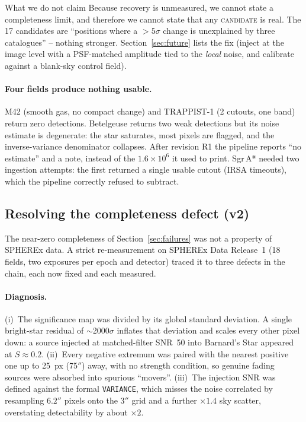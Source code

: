 \documentclass[11pt,a4paper]{article}
\begin{document}
\begin{cautionbox}{What we do not claim}
Because recovery is unmeasured, we cannot state a completeness limit, and therefore we cannot state that
any \textsc{candidate} is real. The 17 candidates are ``positions where a $>5\sigma$ change is
unexplained by three catalogues'' -- nothing stronger. Section~\ref{sec:future} lists the fix (inject at
the image level with a PSF-matched amplitude tied to the \emph{local} noise, and calibrate against a
blank-sky control field).
\end{cautionbox}

\paragraph{Four fields produce nothing usable.} M42 (smooth gas, no compact change) and TRAPPIST-1
(2 cutouts, one band) return zero detections. Betelgeuse returns two weak detections but its noise
estimate is degenerate: the star saturates, most pixels are flagged, and the inverse-variance
denominator collapses. After revision R1 the pipeline reports ``no estimate'' and a note, instead of
the $1.6\times10^{6}$ it used to print. Sgr\,A* needed two ingestion attempts: the first returned a
single usable cutout (IRSA timeouts), which the pipeline correctly refused to subtract.

\subsection{Resolving the completeness defect (v2)}
\label{sec:v2fix}

The near-zero completeness of Section~\ref{sec:failures} was not a property of SPHEREx data. A
strict re-measurement on SPHEREx Data Release~1 (18 fields, two exposures per epoch and detector)
traced it to three defects in the chain, each now fixed and each measured.

\paragraph{Diagnosis.} (i)~The significance map was divided by its global standard deviation.
A single bright-star residual of $\sim$2000$\sigma$ inflates that deviation and scales every other
pixel down: a source injected at matched-filter SNR~50 into Barnard's Star appeared at $S\approx0.2$.
(ii)~Every negative extremum was paired with the nearest positive one up to 25~px (75$''$) away,
with no strength condition, so genuine fading sources were absorbed into spurious ``movers''.
(iii)~The injection SNR was defined against the formal \texttt{VARIANCE}, which misses the noise
correlated by resampling $6.2''$ pixels onto the $3''$ grid and a further $\times1.4$ sky scatter,
overstating detectability by about $\times2$.
\end{document}
